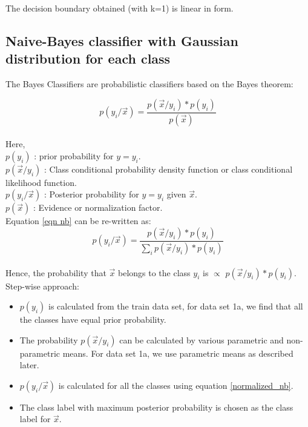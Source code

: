 \documentclass[11pt,a4paper]{article}
\newcommand{\noi}{\noindent}
\begin{document}
The decision boundary obtained (with k=1) is linear in form. 


\subsection{Naive-Bayes classifier with Gaussian distribution for each class}
The Bayes Classifiers are probabilistic classifiers based on the Bayes theorem:

\begin{equation}
\label{eqn nb}
    p(y_{i}/\vec{x})=\frac{p(\vec{x}/y_{i})*p(y_{i})}{p(\vec{x})}
\end{equation}\\

Here, \\ 
$p(y_{i})$ : prior probability for $y=y_{i}$. \\
$p(\vec{x}/y_{i})$ : Class conditional probability density function or class conditional likelihood function. \\
$p(y_{i}/\vec{x})$ : Posterior probability for $y=y_{i}$ given $\vec{x}$.\\
$p(\vec{x})$ : Evidence or normalization factor.\\

\noi
Equation \ref{eqn nb} can be re-written as:
\begin{equation} \label{normalized_nb}
    p(y_{i}/\vec{x})=\frac{p(\vec{x}/y_{i})*p(y_{i})}{\sum_{i}p(\vec{x}/y_{i})*p(y_{i})}
\end{equation}\\

\noi
Hence, the probability that $\vec{x}$ belongs to the class $y_{i}$ is $\propto$ $p(\vec{x}/y_{i})*p(y_{i})$.\\

\noi
Step-wise approach:
\begin{itemize}
    \itemsep0em
    \item $p(y_{i})$ is calculated from the train data set, for data set 1a, we find that all the classes have equal prior probability.
    \item The probability $p(\vec{x}/y_{i})$ can be calculated by various parametric and non-parametric means. For data set 1a, we use parametric means as described later.
    \item $p(y_{i}/\vec{x})$ is calculated for all the classes using equation \ref{normalized_nb}.
    \item The class label with maximum posterior probability is chosen as the class label for $\vec{x}$.
\end{itemize}
\end{document}
